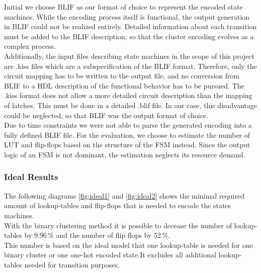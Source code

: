 Initial we choose BLIF as our format of choice to represent the encoded state machines. While the encoding process itself is functional, the output generation in BLIF could not be realized entirely. Detailed information about each transition must be added to the BLIF description, so that the cluster encoding evolves as a complex process. \\
Additionally, the input files describing state machines in the scope of this project are .kiss files which are a subspecification of the BLIF format. Therefore, only the circuit mapping has to be written to the output file, and no conversion from BLIF to a HDL description of the functional behavior has to be pursued. The .kiss format does not allow a more detailed circuit description than the mapping of latches. This must be done in a detailed .blif file. In our case, this disadvantage could be neglected, so that BLIF was the output format of choice. \\
Due to time constraints we were not able to parse the generated encoding into a fully defined BLIF file. For the evaluation, we choose to estimate the number of LUT and flip-flops based on the structure of the FSM instead. Since the output logic of an FSM is not dominant, the estimation neglects its resource demand.

\subsubsection{Ideal Results}
\label{subsubsec:IResults}

The following diagrams \ref{fig:ideal1} and \ref{fig:ideal2} shows the minimal required amount of lookup-tables and flip-flops that is needed to encode the states machines. \\
With the binary clustering method it is possible to decease the number of lookup-tables by 9.96\,\% and the number of flip flops by 52\,\%.\\

This number is based on the ideal model that one lookup-table is needed for one binary cluster or one one-hot encoded state.It excludes all additional lookup-tables needed for transition purposes.

